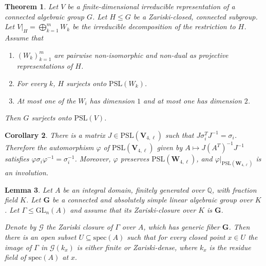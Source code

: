 \documentclass[10pt,a4paper]{amsart}
\newtheorem{theorem}{Theorem}[section]
\newtheorem{lemma}[theorem]{Lemma}
\newtheorem{corollary}[theorem]{Corollary}
\begin{document}
\setcounter{section}{7}
\setcounter{equation}{0}
\setcounter{theorem}{9}
\begin{theorem}
\label{lie algebra amplification}
    Let $V$ be a finite-dimensional irreducible representation of a connected algebraic group $G$. Let $H \leq G$ be a Zariski-closed, connected subgroup. Let $V|_H = \bigoplus_{k=1}^m W_k$ be the irreducible decomposition of the restriction to $H$. Assume that
    \begin{enumerate}
        \item $(W_k)_{k=1}^m$ are pairwise non-isomorphic and non-dual as projective representations of $H$.
        \item For every $k$, $H$ surjects onto $\mathrm{PSL}(W_k)$.
        \item At most one of the $W_i$ has dimension $1$ and at most one has dimension $2$.
    \end{enumerate}
Then $G$ surjects onto $\mathrm{PSL}(V)$.
\end{theorem}

\setcounter{section}{7}
\setcounter{equation}{0}
\setcounter{theorem}{17}
\begin{corollary}
\label{Extension of representation to AutF2}
There is a matrix $J \in \mathrm{PSL}(\textbf{V}_{4,\ell})$ such that $J\sigma_i^TJ^{-1} = \sigma_i$.
Therefore the automorphism $\varphi$ of $\mathrm{PSL}(\textbf{V}_{4,\ell})$ given by $A \mapsto J(A^T)^{-1}J^{-1}$ satisfies $\varphi \sigma_i \varphi^{-1} = \sigma_i^{-1}$. 
Moreover, $\varphi$ preserves $\mathrm{PSL}(\textbf{W}_{4, \ell})$, and $\varphi|_{\mathrm{PSL}(\textbf{W}_{4, \ell})}$ is an involution.
\end{corollary}

\setcounter{section}{7}
\setcounter{equation}{0}
\setcounter{theorem}{20}
\begin{lemma}
\label{Open subset of good specializations}
Let $A$ be an integral domain, finitely generated over $\mathbb{Q}$, with fraction field $K$. Let $\textbf{G}$ be a connected and absolutely simple linear algebraic group over $K$. Let $\Gamma \leq \mathrm{GL}_n(A)$ and assume that its Zariski-closure over $K$ is $\textbf{G}.$

Denote by $\mathcal{G}$ the Zariski closure of $\Gamma$ over $A$, which has generic fiber $\textbf{G}$. Then there is an open subset $U \subseteq \mathrm{spec}(A)$ such that for every closed point $x \in U$ the image of $\Gamma$ in $\mathcal{G}(k_x)$ is either finite or Zariski-dense, where $k_x$ is the residue field of $\mathrm{spec}(A)$ at $x.$
\end{lemma}
\end{document}
